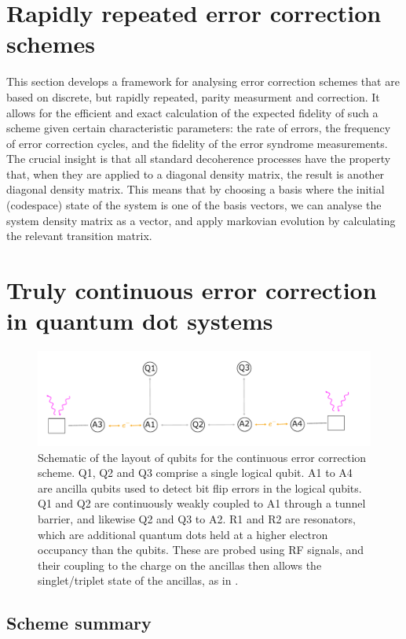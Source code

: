 \documentclass{report}
\begin{document}
\section{Rapidly repeated error correction schemes} \label{sec:repeat_analysis}
This section develops a framework for analysing error correction schemes that are based on discrete, but rapidly repeated, parity measurment and correction. It allows for the efficient and exact calculation of the expected fidelity of such a scheme given certain characteristic parameters: the rate of errors, the frequency of error correction cycles, and the fidelity of the error syndrome measurements.
The crucial insight is that all standard decoherence processes have the property that, when they are applied to a diagonal density matrix, the result is another diagonal density matrix. This means that by choosing a basis where the initial (codespace) state of the system is one of the basis vectors, we can analyse the system density matrix as a vector, and apply markovian evolution by calculating the relevant transition matrix.

\section{Truly continuous error correction in quantum dot systems} \label{sec:truly_continuous_theory}
\begin{figure}[h]
    \centering
    \includegraphics[scale = 0.9]{Figures/7q.pdf}
    \caption{Schematic of the layout of qubits for the continuous error correction scheme. Q1, Q2 and Q3 comprise a single logical qubit. A1 to A4 are ancilla qubits used to detect bit flip errors in the logical qubits. Q1 and Q2 are continuously weakly coupled to A1 through a tunnel barrier, and likewise Q2 and Q3 to A2. R1 and R2 are resonators, which are additional quantum dots held at a higher electron occupancy than the qubits. These are probed using RF signals, and their coupling to the charge on the ancillas then allows the singlet/triplet state of the ancillas, as in \cite{Oakes2022}.}
    \label{fig:7qubitlayout}
\end{figure}
\subsection{Scheme summary}
\end{document}
